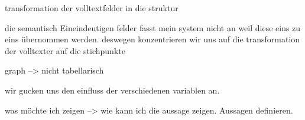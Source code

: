 \documentclass[a4paper,12pt]{scrreprt}
\begin{document}




%





\appendix




transformation der volltextfelder in die struktur

die semantisch Eineindeutigen felder fasst mein system nicht an weil diese eins zu eins übernommen werden. deswegen konzentrieren wir uns auf die transformation der volltexter auf die stichpunkte

graph --> nicht tabellarisch

wir gucken uns den einfluss der verschiedenen variablen an. 

was möchte ich zeigen --> wie kann ich die aussage zeigen. Aussagen definieren.


%
%
\raggedright
\printbibliography
\end{document}
